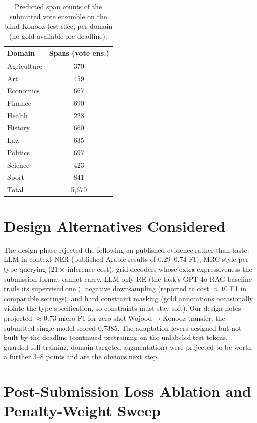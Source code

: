 \documentclass[11pt]{article}
\begin{document}
\begin{table}[H]
\centering
\small
\begin{tabular}{lc}
\toprule
\textbf{Domain} & \textbf{Spans (vote ens.)} \\
\midrule
Agriculture & 370 \\
Art & 459 \\
Economics & 667 \\
Finance & 690 \\
Health & 228 \\
History & 660 \\
Law & 635 \\
Politics & 697 \\
Science & 423 \\
Sport & 841 \\
\midrule
Total & 5,670 \\
\bottomrule
\end{tabular}
\caption{Predicted span counts of the submitted vote ensemble on the
blind Konooz test slice, per domain (no gold available pre-deadline).}
\label{tab:domains}
\end{table}

\section{Design Alternatives Considered}
\label{app:design}

The design phase rejected the following on published evidence rather
than taste: LLM
in-context NER (published Arabic results of 0.29--0.74 F1), MRC-style
per-type querying ($21{\times}$ inference cost), grid decoders whose
extra expressiveness the submission format cannot carry, LLM-only RE
(the task's GPT-4o RAG baseline trails its supervised one
\citep{aljabari-etal-2025-wojoodrelations}), negative downsampling
(reported to cost ${\approx}10$ F1 in comparable settings), and hard
constraint masking (gold annotations occasionally violate the type
specification, so constraints must stay soft). Our design notes
projected ${\approx}0.73$ micro-F1 for zero-shot
Wojood$\rightarrow$Konooz transfer; the submitted single model scored
0.7385. The adaptation levers designed but not built by the deadline
(continued pretraining on the unlabeled test tokens, guarded
self-training, domain-targeted augmentation) were projected to be worth
a further 3--8 points and are the obvious next step.

\section{Post-Submission Loss Ablation and Penalty-Weight Sweep}
\label{app:ablation}
\end{document}
